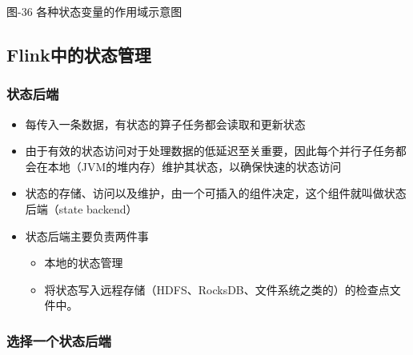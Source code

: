 图-36 各种状态变量的作用域示意图

\hypertarget{flinkux4e2dux7684ux72b6ux6001ux7ba1ux7406}{%
\subsection{Flink中的状态管理}\label{flinkux4e2dux7684ux72b6ux6001ux7ba1ux7406}}

\hypertarget{ux72b6ux6001ux540eux7aef}{%
\subsubsection{状态后端}\label{ux72b6ux6001ux540eux7aef}}

\begin{itemize}
\tightlist
\item
  每传入一条数据，有状态的算子任务都会读取和更新状态
\item
  由于有效的状态访问对于处理数据的低延迟至关重要，因此每个并行子任务都会在本地（JVM的堆内存）维护其状态，以确保快速的状态访问
\item
  状态的存储、访问以及维护，由一个可插入的组件决定，这个组件就叫做状态后端（state
  backend）
\item
  状态后端主要负责两件事

  \begin{itemize}
  \tightlist
  \item
    本地的状态管理
  \item
    将状态写入远程存储（HDFS、RocksDB、文件系统之类的）的检查点文件中。
  \end{itemize}
\end{itemize}

\hypertarget{ux9009ux62e9ux4e00ux4e2aux72b6ux6001ux540eux7aef}{%
\subsubsection{选择一个状态后端}\label{ux9009ux62e9ux4e00ux4e2aux72b6ux6001ux540eux7aef}}

